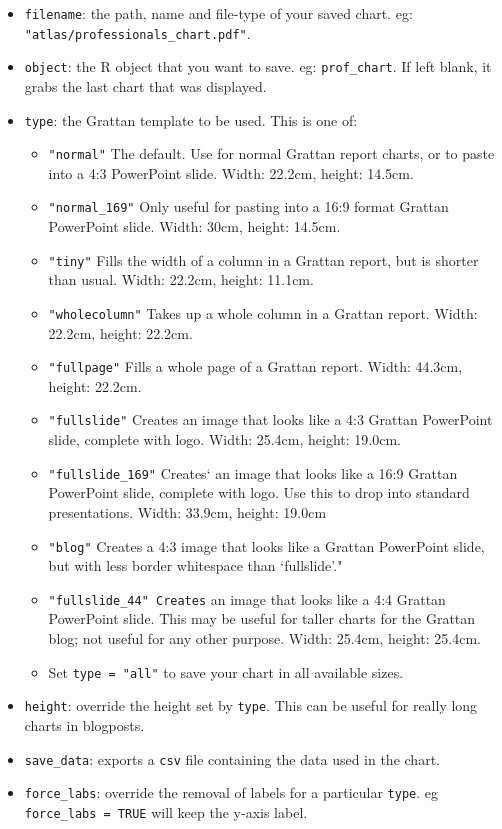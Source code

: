 \documentclass[
]{book}
\providecommand{\tightlist}{%
  \setlength{\itemsep}{0pt}\setlength{\parskip}{0pt}}
\begin{document}
\begin{itemize}
\tightlist
\item
  \texttt{filename}: the path, name and file-type of your saved chart. eg: \texttt{"atlas/professionals\_chart.pdf"}.
\item
  \texttt{object}: the R object that you want to save. eg: \texttt{prof\_chart}. If left blank, it grabs the last chart that was displayed.
\item
  \texttt{type}: the Grattan template to be used. This is one of:

  \begin{itemize}
  \tightlist
  \item
    \texttt{"normal"} The default. Use for normal Grattan report charts, or to paste into a 4:3 PowerPoint slide. Width: 22.2cm, height: 14.5cm.
  \item
    \texttt{"normal\_169"} Only useful for pasting into a 16:9 format Grattan PowerPoint slide. Width: 30cm, height: 14.5cm.
  \item
    \texttt{"tiny"} Fills the width of a column in a Grattan report, but is shorter than usual. Width: 22.2cm, height: 11.1cm.
  \item
    \texttt{"wholecolumn"} Takes up a whole column in a Grattan report. Width: 22.2cm, height: 22.2cm.
  \item
    \texttt{"fullpage"} Fills a whole page of a Grattan report. Width: 44.3cm, height: 22.2cm.
  \item
    \texttt{"fullslide"} Creates an image that looks like a 4:3 Grattan PowerPoint slide, complete with logo. Width: 25.4cm, height: 19.0cm.
  \item
    \texttt{"fullslide\_169"} Creates` an image that looks like a 16:9 Grattan PowerPoint slide, complete with logo. Use this to drop into standard presentations. Width: 33.9cm, height: 19.0cm
  \item
    \texttt{"blog"} Creates a 4:3 image that looks like a Grattan PowerPoint slide, but with less border whitespace than `fullslide'."
  \item
    \texttt{"fullslide\_44"\ Creates} an image that looks like a 4:4 Grattan PowerPoint slide. This may be useful for taller charts for the Grattan blog; not useful for any other purpose. Width: 25.4cm, height: 25.4cm.
  \item
    Set \texttt{type\ =\ "all"} to save your chart in all available sizes.
  \end{itemize}
\item
  \texttt{height}: override the height set by \texttt{type}. This can be useful for really long charts in blogposts.
\item
  \texttt{save\_data}: exports a \texttt{csv} file containing the data used in the chart.
\item
  \texttt{force\_labs}: override the removal of labels for a particular \texttt{type}. eg \texttt{force\_labs\ =\ TRUE} will keep the y-axis label.
\end{itemize}
\end{document}

